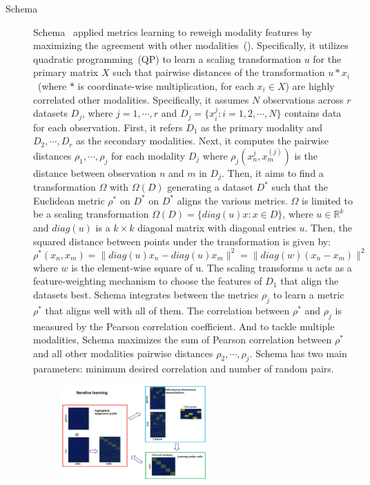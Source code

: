 \begin{description}
  \item[Schema]
  Schema~\citep{singh2021schema} applied metrics learning to reweigh modality features by maximizing the agreement with other modalities~(). Specifically, it utilizes quadratic programming~(QP) to learn a scaling transformation $u$ for the primary matrix $X$ such that pairwise distances of the transformation $u * x_i$~(where $*$ is coordinate-wise multiplication, for each $x_i\in X$) are highly correlated other modalities. Specifically, it assumes $N$ observations across $r$ datasets $D_j$, where $j=1,\cdots,r$ and $D_j = \{x_i^{j}: i = 1,2,\cdots,N\}$ contains data for each observation. First, it refers $D_1$ as the primary modality and $D_2,\cdots,D_r$ as the secondary modalities. Next, it computes the pairwise distances $\rho_1,\cdots,\rho_j$ for each modality $D_j$ where $\rho_j(x_n^{j}, x_m^{(j)})$ is the distance between observation $n$ and $m$ in $D_j$. Then, it aims to find a transformation $\Omega$ with $\Omega(D)$ generating a dataset $D^{*}$ such that the Euclidean metric $\rho^{*}$ on $D^{*}$ on $D^{*}$ aligns the various metrics. $\Omega$ is limited to be a scaling transformation $\Omega(D) = \{diag(u)x: x \in D\}$, where $u \in \mathbb{R}^{k}$ and $diag(u)$ is a $k\times k$ diagonal matrix with diagonal entries $u$. Then, the squared distance between points under the transformation is given by:
  \begin{equation}
  \rho^{*}(x_n, x_m) = \|diag(u)x_n - diag(u)x_m\|^2 = \|diag(w)(x_n - x_m)\|^2
  \end{equation}
  where $w$ is the element-wise square of u. The scaling transforms u acts as a feature-weighting mechanism to choose the features of $D_1$ that align the datasets best. Schema integrates between the metrics $\rho_j$ to learn a metric $\rho^{*}$ that aligns well with all of them. The correlation between $\rho^{*}$ and $\rho_j$ is measured by the Pearson correlation coefficient. And to tackle multiple modalities, Schema maximizes the sum of Pearson correlation between $\rho^{*}$ and all other modalities pairwise distances $\rho_2,\cdots,\rho_j$. Schema has two main parameters: minimum desired correlation and number of random pairs.
\begin{figure}[!h]
  	\centering
  	\includegraphics[width=0.55\textwidth]{Alg_scAI/fig}

\end{figure}
\end{description}
